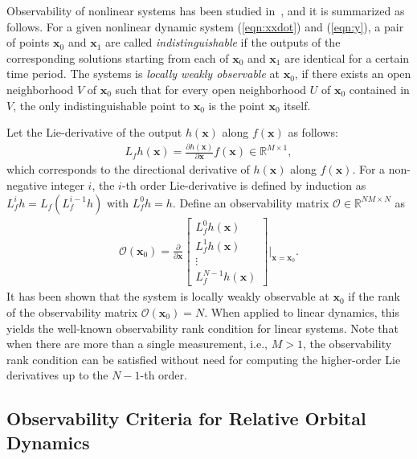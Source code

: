 \documentclass[12pt,letterpaper]{ISSFD_v01}
\newcommand{\refeqn}[1]{(\ref{eqn:#1})}
\newcommand{\deriv}[2]{\ensuremath{\frac{\partial #1}{\partial #2}}}
\renewcommand{\L}{\ensuremath{\mathsf{L}}}
\renewcommand{\Re}{\ensuremath{\mathbb{R}}}
\newcommand{\x}{\mathbf{x}}
\begin{document}
Observability of nonlinear systems has been studied in~\cite{HerKreITAC77}, and it is summarized as follows. For a given nonlinear dynamic system \refeqn{xxdot} and \refeqn{y}, a pair of points $\x_0$ and $\x_1$ are called \textit{indistinguishable} if the outputs of the corresponding solutions starting from each of $\x_0$ and $\x_1$ are identical for a certain time period. The systems is \textit{locally weakly observable} at $\x_0$, if there exists an open neighborhood $V$ of $\x_0$ such that for every open neighborhood $U$ of $\x_0$ contained in $V$, the only indistinguishable point to $\x_0$ is the point $\x_0$ itself. 

Let the Lie-derivative of the output $h(\x)$ along $f(\x)$ as follows:
\begin{align*}
L_f h(\x) = \deriv{h(\x)}{\x}f(\x)\in\Re^{M\times 1},
\end{align*}
which corresponds to the directional derivative of $h(\x)$ along $f(\x)$. For a non-negative integer $i$, the $i$-th order Lie-derivative is defined by induction as $L_f^i h = L_f (L_f^{i-1} h)$ with $L_f^0 h = h$. Define an observability matrix $\mathcal{O}\in\Re^{NM\times N}$ as
\begin{align*}
\mathcal{O}(\x_0) = \deriv{}{\x} \begin{bmatrix} L_f^0 h(\x) \\ L_f^1 h(\x)\\ \vdots \\L_f^{N-1} h(\x)\end{bmatrix}\bigg|_{\x=\x_0}.
\end{align*}
It has been shown that the system is locally weakly observable at $\x_0$ if the rank of the observability matrix $\mathcal{O}(\x_0) = N$. When applied to linear dynamics, this yields the well-known observability rank condition for linear systems. Note that when there are more than a single measurement, i.e., $M>1$, the observability rank condition can be satisfied without need for computing the higher-order Lie derivatives up to the $N-1$-th order.

\subsection{Observability Criteria for Relative Orbital Dynamics}
\end{document}
